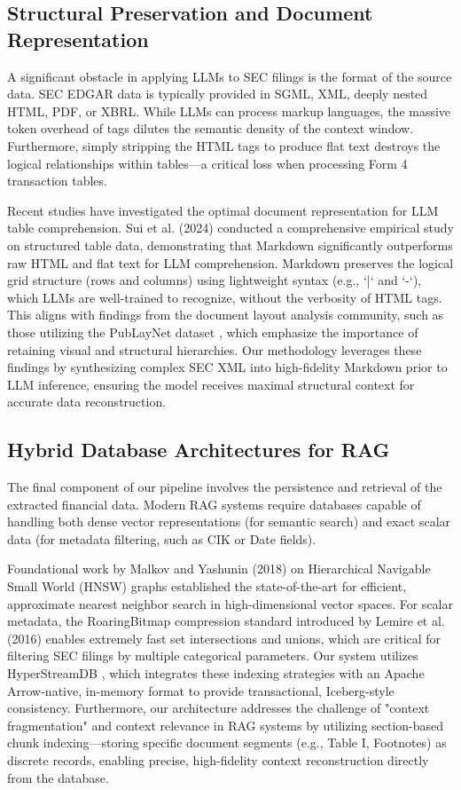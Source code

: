 \documentclass[journal, onecolumn]{IEEEtran}
\begin{document}
\subsection{Structural Preservation and Document Representation}
A significant obstacle in applying LLMs to SEC filings is the format of the source data. SEC EDGAR data is typically provided in SGML, XML, deeply nested HTML, PDF, or XBRL. While LLMs can process markup languages, the massive token overhead of tags dilutes the semantic density of the context window. Furthermore, simply stripping the HTML tags to produce flat text destroys the logical relationships within tables---a critical loss when processing Form 4 transaction tables.

Recent studies have investigated the optimal document representation for LLM table comprehension. Sui et al. (2024) \cite{sui2024table} conducted a comprehensive empirical study on structured table data, demonstrating that Markdown significantly outperforms raw HTML and flat text for LLM comprehension. Markdown preserves the logical grid structure (rows and columns) using lightweight syntax (e.g., `|` and `-`), which LLMs are well-trained to recognize, without the verbosity of HTML tags. This aligns with findings from the document layout analysis community, such as those utilizing the PubLayNet dataset \cite{zhong2020publaynet}, which emphasize the importance of retaining visual and structural hierarchies. Our methodology leverages these findings by synthesizing complex SEC XML into high-fidelity Markdown prior to LLM inference, ensuring the model receives maximal structural context for accurate data reconstruction.

\subsection{Hybrid Database Architectures for RAG}
The final component of our pipeline involves the persistence and retrieval of the extracted financial data. Modern RAG systems require databases capable of handling both dense vector representations (for semantic search) and exact scalar data (for metadata filtering, such as CIK or Date fields). 

Foundational work by Malkov and Yashunin (2018) \cite{malkov2018hnsw} on Hierarchical Navigable Small World (HNSW) graphs established the state-of-the-art for efficient, approximate nearest neighbor search in high-dimensional vector spaces. For scalar metadata, the RoaringBitmap compression standard introduced by Lemire et al. (2016) \cite{lemire2016roaring} enables extremely fast set intersections and unions, which are critical for filtering SEC filings by multiple categorical parameters. Our system utilizes HyperStreamDB \cite{albright_hyperstreamdb}, which integrates these indexing strategies with an Apache Arrow-native, in-memory format to provide transactional, Iceberg-style consistency. Furthermore, our architecture addresses the challenge of "context fragmentation" and context relevance in RAG systems \cite{es2023ragas} by utilizing section-based chunk indexing---storing specific document segments (e.g., Table I, Footnotes) as discrete records, enabling precise, high-fidelity context reconstruction directly from the database.
\end{document}
